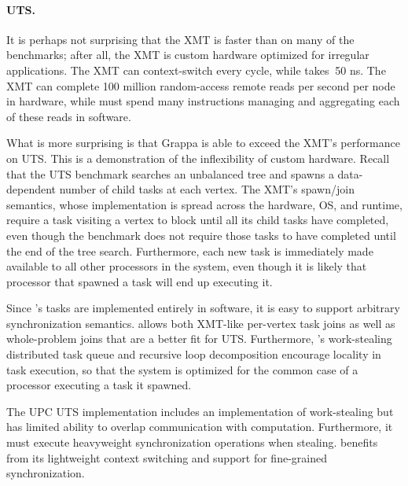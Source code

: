 \paragraph{UTS.}
It is perhaps not surprising that the XMT is faster than
\Grappa on many of the benchmarks; after all, the XMT is custom
hardware optimized for irregular applications. The XMT can
context-switch every cycle, while \Grappa takes $~$50 ns. The XMT can
complete 100 million random-access remote reads per second per node in
hardware, while \Grappa must spend many instructions managing and
aggregating each of these reads in software.

What is more surprising is that Grappa is able to exceed the XMT's
performance on UTS. This is a demonstration of the inflexibility of
custom hardware. Recall that the UTS benchmark searches an unbalanced
tree and spawns a data-dependent number of child tasks at each
vertex. The XMT's spawn/join semantics, whose implementation is spread
across the hardware, OS, and runtime, require a task visiting a vertex
to block until all its child tasks have completed, even though the
benchmark does not require those tasks to have completed until the end
of the tree search. Furthermore, each new task is immediately made
available to all other processors in the system, even though it is
likely that processor that spawned a task will end up executing it.

Since \Grappa's tasks are implemented entirely in software, it is easy
to support arbitrary synchronization semantics. \Grappa allows both
XMT-like per-vertex task joins as well as whole-problem joins that are
a better fit for UTS. Furthermore, \Grappa's work-stealing distributed
task queue and recursive loop decomposition encourage locality in task
execution, so that the system is optimized for the common case of a
processor executing a task it spawned.

The UPC UTS implementation includes an implementation of work-stealing
but has limited ability to overlap communication with
computation. Furthermore, it must execute heavyweight synchronization
operations when stealing. \Grappa benefits from its lightweight
context switching and support for fine-grained synchronization.

